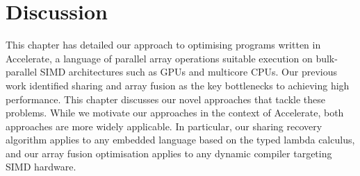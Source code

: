 %
%
%
%
%
%


\section{Discussion}

This chapter has detailed our approach to optimising programs written in
Accelerate, a language of parallel array operations suitable execution on
bulk-parallel SIMD architectures such as GPUs and multicore CPUs. Our previous
work identified sharing and array fusion as the key bottlenecks to achieving
high performance. This chapter discusses our novel approaches that tackle these
problems. While we motivate our approaches in the context of Accelerate, both
approaches are more widely applicable. In particular, our sharing recovery
algorithm applies to any embedded language based on the typed lambda calculus,
and our array fusion optimisation applies to any dynamic compiler targeting
SIMD hardware.

